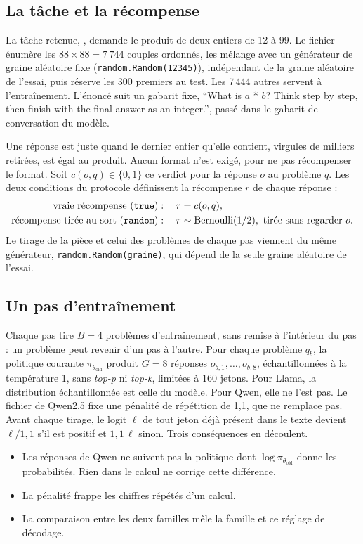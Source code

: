 \subsection{La tâche et la récompense}

La tâche retenue, , demande le produit de deux entiers de 12 à 99. Le fichier énumère les
$88 \times 88 = 7\,744$ couples ordonnés, les mélange avec un générateur de graine aléatoire fixe
(\texttt{random.Random(12345)}), indépendant de la graine aléatoire de l'essai, puis réserve les 300 premiers
au test. Les 7\,444 autres servent à l'entraînement. L'énoncé suit un gabarit fixe, \enquote{What is
$a$ * $b$? Think step by step, then finish with the final answer as an integer.}, passé dans le
gabarit de conversation du modèle.

Une réponse est juste quand le dernier entier qu'elle contient, virgules de milliers retirées, est
égal au produit. Aucun format n'est exigé, pour ne pas récompenser le format. Soit $c(o, q) \in
\{0,1\}$ ce verdict pour la réponse $o$ au problème $q$. Les deux conditions du protocole
définissent la récompense $r$ de chaque réponse :
\begin{align}
  \text{vraie récompense (\texttt{true})} &: \quad r = c(o, q),\\
  \text{récompense tirée au sort (\texttt{random})} &: \quad r \sim \mathrm{Bernoulli}(1/2),
  \text{ tirée sans regarder } o.
\end{align}
Le tirage de la pièce et celui des problèmes de chaque pas viennent du même générateur,
\texttt{random.Random(graine)}, qui dépend de la seule graine aléatoire de l'essai.

\subsection{Un pas d'entraînement}

Chaque pas tire $B = 4$ problèmes d'entraînement, sans remise à l'intérieur du pas : un problème peut revenir
d'un pas à l'autre. Pour chaque problème $q_b$, la
politique courante $\pi_{\theta_{\text{old}}}$ produit $G = 8$ réponses $o_{b,1}, \dots, o_{b,8}$,
échantillonnées à la température 1, sans \emph{top-p} ni \emph{top-k}, limitées à 160 jetons. Pour Llama, la
distribution échantillonnée est celle du modèle. Pour Qwen, elle ne l'est pas. Le fichier
 de Qwen2.5 fixe une pénalité de répétition de 1,1, que  ne
remplace pas. Avant chaque tirage, le logit $\ell$ de tout jeton déjà présent dans le texte devient $\ell/1{,}1$
s'il est positif et $1{,}1\,\ell$ sinon. Trois conséquences en découlent.
\begin{itemize}
  \item Les réponses de Qwen ne suivent pas la politique dont $\log \pi_{\theta_{\text{old}}}$ donne les
        probabilités. Rien dans le calcul ne corrige cette différence.
  \item La pénalité frappe les chiffres répétés d'un calcul.
  \item La comparaison entre les deux familles mêle la famille et ce réglage de décodage.
\end{itemize}

